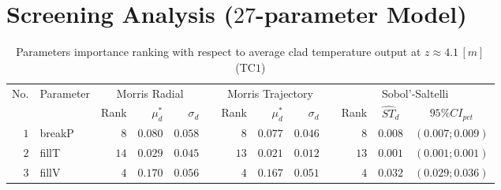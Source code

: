 \section{Screening Analysis ($27$-parameter Model)}\label{app:tbl_results_screening}

\begin{table*}[!htbp]\centering
{}
\caption{Parameters importance ranking with respect to average clad temperature output at $z \approx 4.1 \, [m]$ (TC$1$)}
\label{tab:app_screening_tc1_average}
\begin{tabular}{@{}rlrrrrrrrrrcc@{}}\toprule
\multirow{2}{*}{\footnotesize{No.}} & \multirow{2}{*}{\footnotesize{Parameter}} & \multicolumn{3}{c}{\footnotesize{Morris Radial}} & \phantom{a} & \multicolumn{3}{c}{\footnotesize{Morris Trajectory}}  &\phantom{a}& \multicolumn{3}{c}{\footnotesize{Sobol'-Saltelli}}                               \\             
                                                                                  \cmidrule{3-5}                                                   \cmidrule{7-9}                                                      \cmidrule{11-13}
                                    &                                           & \footnotesize{Rank}   & $\mu^*_d$ & $\sigma_d$   &             & \footnotesize{Rank} & $\mu^*_d$ & $\sigma_d$          &           & \footnotesize{Rank} & \footnotesize{$\hat{ST}_d$} & \footnotesize{$95\%CI_{pct}$}\\ \midrule
\footnotesize{$1 $} & \footnotesize{breakP   } & \footnotesize{$8 $} & \footnotesize{$0.080$} & \footnotesize{$0.058$} && \footnotesize{$8 $} & \footnotesize{$0.077$} & \footnotesize{$0.046$} && \footnotesize{$8 $} & \footnotesize{$0.008$} & \footnotesize{$(0.007;0.009)$} \\
\footnotesize{$2 $} & \footnotesize{fillT    } & \footnotesize{$14$} & \footnotesize{$0.029$} & \footnotesize{$0.045$} && \footnotesize{$13$} & \footnotesize{$0.021$} & \footnotesize{$0.012$} && \footnotesize{$13$} & \footnotesize{$0.001$} & \footnotesize{$(0.001;0.001)$} \\
\footnotesize{$3 $} & \footnotesize{fillV    } & \footnotesize{$4 $} & \footnotesize{$0.170$} & \footnotesize{$0.056$} && \footnotesize{$4 $} & \footnotesize{$0.167$} & \footnotesize{$0.051$} && \footnotesize{$4 $} & \footnotesize{$0.032$} & \footnotesize{$(0.029;0.036)$} \\

\end{tabular}
\end{table*}
